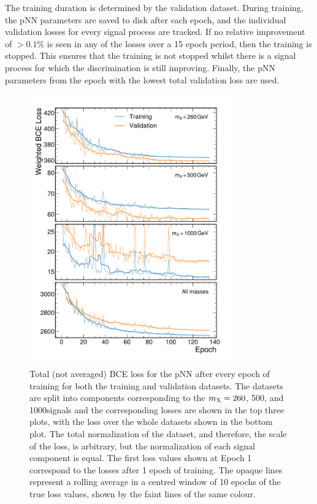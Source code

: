 The training duration is determined by the validation dataset. During training, the pNN parameters are saved to disk after each epoch, and the individual validation losses for every signal process are tracked. If no relative improvement of $>0.1\%$ is seen in any of the losses over a 15 epoch period, then the training is stopped. This ensures that the training is not stopped whilst there is a signal process for which the discrimination is still improving. Finally, the pNN parameters from the epoch with the lowest total validation loss are used. 

\begin{figure}
    \centering
    \includegraphics[width=0.8\textwidth]{Figures/Dihiggs/categorisation/graviton_loss_split.pdf}
    \caption[Evolution of BCE Loss for the \XTwoHH pNN Split by Mass Point]{Total (not averaged) BCE loss for the \XTwoHH pNN after every epoch of training for both the training and validation datasets. The datasets are split into components corresponding to the $m_{\mathrm{X}} = 260$, 500, and 1000\GeV signals and the corresponding losses are shown in the top three plots, with the loss over the whole datasets shown in the bottom plot. The total normalization of the dataset, and therefore, the scale of the loss, is arbitrary, but the normalization of each signal component is equal. The first loss values shown at Epoch 1 correspond to the losses after 1 epoch of training. The opaque lines represent a rolling average in a centred window of 10 epochs of the true loss values, shown by the faint lines of the same colour.}\label{fig:pNN_loss_graviton}
\end{figure}

